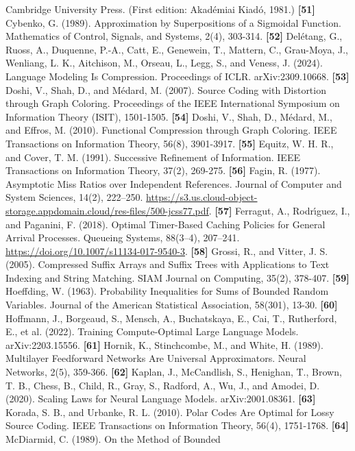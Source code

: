 \documentclass[
]{article}
\begin{document}
Cambridge University Press. (First edition: Akad\'emiai Kiad\'o, 1981.)
\textbf{{[}51{]}} Cybenko, G. (1989). Approximation by Superpositions
of a Sigmoidal Function. Mathematics of Control, Signals, and Systems,
2(4), 303-314.
\textbf{{[}52{]}} Del\'etang, G., Ruoss, A., Duquenne, P.-A., Catt, E.,
Genewein, T., Mattern, C., Grau-Moya, J., Wenliang, L. K.,
Aitchison, M., Orseau, L., Legg, S., and Veness, J. (2024). Language
Modeling Is Compression. Proceedings of ICLR. arXiv:2309.10668.
\textbf{{[}53{]}} Doshi, V., Shah, D., and M\'edard, M. (2007). Source
Coding with Distortion through Graph Coloring. Proceedings of the IEEE
International Symposium on Information Theory (ISIT), 1501-1505.
\textbf{{[}54{]}} Doshi, V., Shah, D., M\'edard, M., and Effros, M.
(2010). Functional Compression through Graph Coloring. IEEE
Transactions on Information Theory, 56(8), 3901-3917.
\textbf{{[}55{]}} Equitz, W. H. R., and Cover, T. M. (1991). Successive
Refinement of Information. IEEE Transactions on Information Theory,
37(2), 269-275.
\textbf{{[}56{]}} Fagin, R. (1977). Asymptotic Miss Ratios
over Independent References. Journal of Computer and System Sciences,
14(2), 222--250. \url{https://s3.us.cloud-object-storage.appdomain.cloud/res-files/500-jcss77.pdf}.
\textbf{{[}57{]}} Ferragut, A., Rodr{\'\i}guez, I., and Paganini, F.
(2018). Optimal Timer-Based Caching Policies for General Arrival
Processes. Queueing Systems, 88(3--4), 207--241.
\url{https://doi.org/10.1007/s11134-017-9540-3}.
\textbf{{[}58{]}} Grossi, R., and Vitter, J. S. (2005). Compressed
Suffix Arrays and Suffix Trees with Applications to Text Indexing and
String Matching. SIAM Journal on Computing, 35(2), 378-407.
\textbf{{[}59{]}} Hoeffding, W. (1963). Probability Inequalities for
Sums of Bounded Random Variables. Journal of the American Statistical
Association, 58(301), 13-30.
\textbf{{[}60{]}} Hoffmann, J., Borgeaud, S., Mensch, A., Buchatskaya,
E., Cai, T., Rutherford, E., et al. (2022). Training Compute-Optimal
Large Language Models. arXiv:2203.15556.
\textbf{{[}61{]}} Hornik, K., Stinchcombe, M., and White, H. (1989).
Multilayer Feedforward Networks Are Universal Approximators. Neural
Networks, 2(5), 359-366.
\textbf{{[}62{]}} Kaplan, J., McCandlish, S., Henighan, T., Brown,
T. B., Chess, B., Child, R., Gray, S., Radford, A., Wu, J., and
Amodei, D. (2020). Scaling Laws for Neural Language Models.
arXiv:2001.08361.
\textbf{{[}63{]}} Korada, S. B., and Urbanke, R. L. (2010). Polar
Codes Are Optimal for Lossy Source Coding. IEEE Transactions on
Information Theory, 56(4), 1751-1768.
\textbf{{[}64{]}} McDiarmid, C. (1989). On the Method of Bounded
\end{document}
